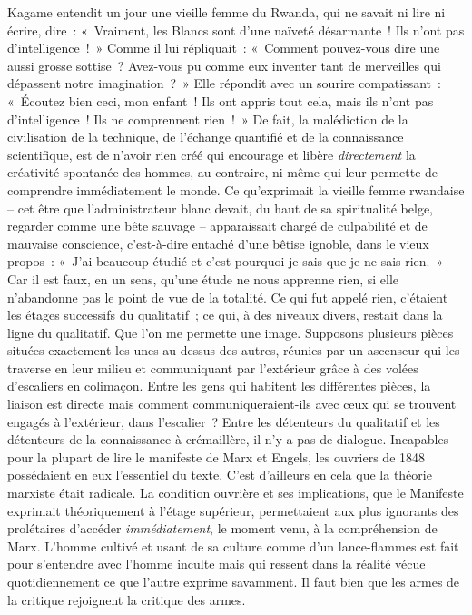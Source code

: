 \documentclass[french,twoside]{book} %
\begin{document}
Kagame entendit un jour une vieille femme du Rwanda, qui ne savait ni lire ni écrire, dire : « Vraiment, les Blancs sont d’une naïveté désarmante ! Ils n’ont pas d’intelligence ! » Comme il lui répliquait : « Comment pouvez-vous dire une aussi grosse sottise ? Avez-vous pu comme eux inventer tant de merveilles qui dépassent notre imagination ? » Elle répondit avec un sourire compatissant : « Écoutez bien ceci, mon enfant ! Ils ont appris tout cela, mais ils n’ont pas d’intelligence ! Ils ne comprennent rien ! » De fait, la malédiction de la civilisation de la technique, de l’échange quantifié et de la connaissance scientifique, est de n’avoir rien créé qui encourage et libère \emph{directement} la créativité spontanée des hommes, au contraire, ni même qui leur permette de comprendre immédiatement le monde. Ce qu’exprimait la vieille femme rwandaise – cet être que l’administrateur blanc devait, du haut de sa spiritualité belge, regarder comme une bête sauvage – apparaissait chargé de culpabilité et de mauvaise conscience, c’est-à-dire entaché d’une bêtise ignoble, dans le vieux propos : « J’ai beaucoup étudié et c’est pourquoi je sais que je ne sais rien. » Car il est faux, en un sens, qu’une étude ne nous apprenne rien, si elle n’abandonne pas le point de vue de la totalité. Ce qui fut appelé rien, c’étaient les étages successifs du qualitatif ; ce qui, à des niveaux divers, restait dans la ligne du qualitatif. Que l’on me permette une image. Supposons plusieurs pièces situées exactement les unes au-dessus des autres, réunies par un ascenseur qui les traverse en leur milieu et communiquant par l’extérieur grâce à des volées d’escaliers en colimaçon. Entre les gens qui habitent les différentes pièces, la liaison est directe mais comment communiqueraient-ils avec ceux qui se trouvent engagés à l’extérieur, dans l’escalier ? Entre les détenteurs du qualitatif et les détenteurs de la connaissance à crémaillère, il n’y a pas de dialogue. Incapables pour la plupart de lire le manifeste de Marx et Engels, les ouvriers de 1848 possédaient en eux l’essentiel du texte. C’est d’ailleurs en cela que la théorie marxiste était radicale. La condition ouvrière et ses implications, que le Manifeste exprimait théoriquement à l’étage supérieur, permettaient aux plus ignorants des prolétaires d’accéder \emph{immédiatement}, le moment venu, à la compréhension de Marx. L’homme cultivé et usant de sa culture comme d’un lance-flammes est fait pour s’entendre avec l’homme inculte mais qui ressent dans la réalité vécue quotidiennement ce que l’autre exprime savamment. Il faut bien que les armes de la critique rejoignent la critique des armes.\par
\end{document}
